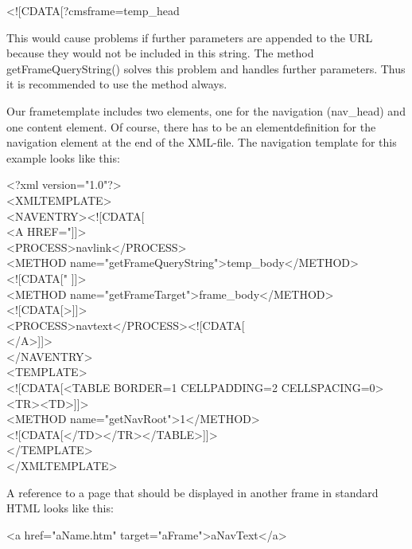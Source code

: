 \begin{xml}
<![CDATA[?cmsframe=temp\_head
\end{xml}

This would cause problems if further parameters are appended to the
URL because they would not be included in this string. The method {\meth
getFrameQueryString()} solves this problem and handles further
parameters. Thus it is recommended to use the method always.

Our frametemplate includes two elements, one for the navigation
(nav\_head) and one content element. Of course, there has to be an
elementdefinition for the navigation element at the end of the
XML-file.  The navigation template for this example looks like
this:

\begin{xml}
<?xml version="1.0"?>\\
<XMLTEMPLATE>\\

<NAVENTRY><![CDATA[\\
\xtaba   <A HREF="]]>\\
\xtaba   <PROCESS>navlink</PROCESS>\\
\xtaba     <METHOD name="getFrameQueryString">temp\_body</METHOD>\\
\xtaba     <![CDATA[" ]]>\\
\xtaba     <METHOD name="getFrameTarget">frame\_body</METHOD>\\
\xtaba     <![CDATA[>]]>\\
\xtaba   <PROCESS>navtext</PROCESS><![CDATA[\\
\xtaba   </A>]]>\\
</NAVENTRY>\\

<TEMPLATE>\\
\xtaba   <![CDATA[<TABLE BORDER=1 CELLPADDING=2 CELLSPACING=0><TR><TD>]]>\\
\xtaba   <METHOD name="getNavRoot">1</METHOD>\\
\xtaba   <![CDATA[</TD></TR></TABLE>]]>\\
</TEMPLATE>\\

</XMLTEMPLATE>\\
\end{xml}

A reference to a page that should be displayed in another frame in standard HTML looks like
this:

{\tag <a href="aName.htm" target="aFrame">aNavText</a>}

